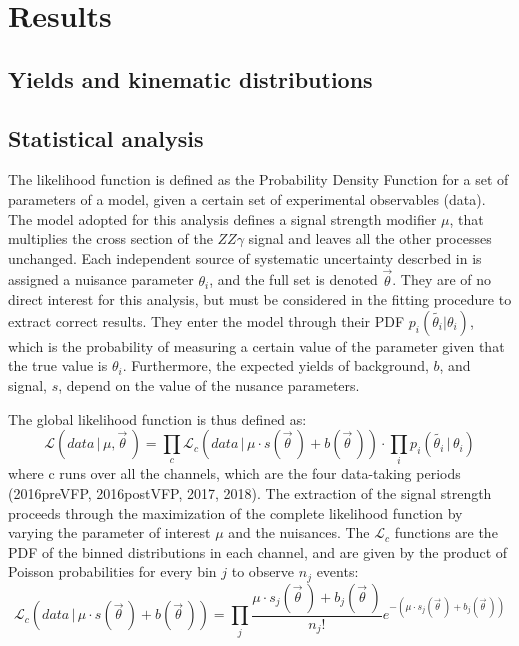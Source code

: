 \chapter{Results}
\section{Yields and kinematic distributions}
\section{Statistical analysis}
\label{sec:statistical_analysis}
The likelihood function is defined as the Probability Density Function for a set of parameters of a model, given a certain set of experimental observables (data).
The model adopted for this analysis defines a signal strength modifier $\mu$, that multiplies the cross section of the $ZZ\gamma$ signal and leaves all the other processes unchanged.
Each independent source of systematic uncertainty descrbed in  is assigned a nuisance parameter $\theta_i$, and the full set is denoted $\vec\theta$.
They are of no direct interest for this analysis, but must be considered in the fitting procedure to extract correct results.
They enter the model through their PDF $p_i(\tilde{\theta_i}|\theta_i)$, which is the probability of measuring a certain value of the parameter given that the true value is $\theta_i$.
Furthermore, the expected yields of background, $b$, and signal, $s$, depend on the value of the nusance parameters.

The global likelihood function is thus defined as:
\begin{equation}
  \label{eq:likelihood_full}
  \mathcal{L}(data\, |\, \mu, \vec\theta\,) = \prod_c \mathcal{L}_c(data\, |\, \mu \cdot s(\vec\theta\,) + b(\vec\theta\,)) \cdot \prod_i p_i(\tilde{\theta_i}\, |\, \theta_i)
\end{equation}
where c runs over all the channels, which are the four data-taking periods (2016preVFP, 2016postVFP, 2017, 2018).
The extraction of the signal strength proceeds through the maximization of the complete likelihood function by varying the parameter of interest $\mu$ and the nuisances.
The $\mathcal{L}_c$ functions are the PDF of the binned distributions in each channel, and are given by the product of Poisson probabilities for every bin $j$ to observe $n_j$ events:
\begin{equation}
  \label{eq:likelihood_bin}
  \mathcal{L}_c(data\, |\, \mu \cdot s(\vec\theta\,) + b(\vec\theta\,)) = \prod_j \frac{\mu \cdot s_j(\vec\theta\,) + b_j(\vec\theta\,)}{n_j!} e^{-(\mu \cdot s_j(\vec\theta\,) + b_j(\vec\theta\,))}
\end{equation}

